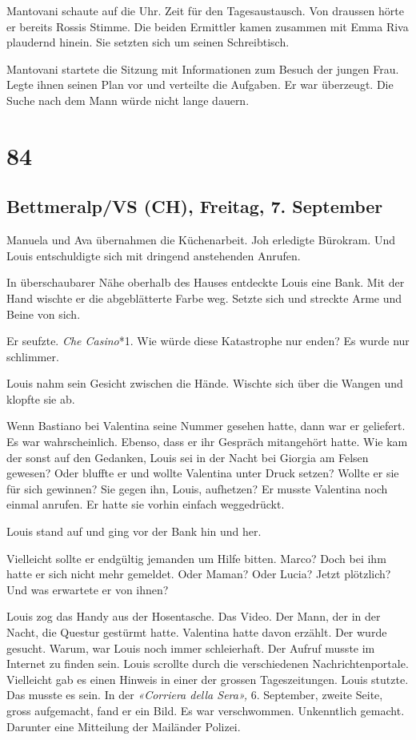 Mantovani schaute auf die Uhr. Zeit für den Tagesaustausch. Von draussen
hörte er bereits Rossis Stimme. Die beiden Ermittler kamen zusammen mit
Emma Riva plaudernd hinein. Sie setzten sich um seinen Schreibtisch.

Mantovani startete die Sitzung mit Informationen zum Besuch der jungen
Frau. Legte ihnen seinen Plan vor und verteilte die Aufgaben. Er war
überzeugt. Die Suche nach dem Mann würde nicht lange dauern.

\chapter{84}\label{section-84}

\section{Bettmeralp/VS (CH), Freitag, 7.
September}\label{bettmeralpvs-ch-freitag-7.-september}

Manuela und Ava übernahmen die Küchenarbeit. Joh erledigte Bürokram. Und
Louis entschuldigte sich mit dringend anstehenden Anrufen.

In überschaubarer Nähe oberhalb des Hauses entdeckte Louis eine Bank.
Mit der Hand wischte er die abgeblätterte Farbe weg. Setzte sich und
streckte Arme und Beine von sich.

Er seufzte. \emph{Che Casino}*1. Wie würde diese Katastrophe nur enden?
Es wurde nur schlimmer.

Louis nahm sein Gesicht zwischen die Hände. Wischte sich über die Wangen
und klopfte sie ab.

Wenn Bastiano bei Valentina seine Nummer gesehen hatte, dann war er
geliefert. Es war wahrscheinlich. Ebenso, dass er ihr Gespräch
mitangehört hatte. Wie kam der sonst auf den Gedanken, Louis sei in der
Nacht bei Giorgia am Felsen gewesen? Oder bluffte er und wollte
Valentina unter Druck setzen? Wollte er sie für sich gewinnen? Sie gegen
ihn, Louis, aufhetzen? Er musste Valentina noch einmal anrufen. Er hatte
sie vorhin einfach weggedrückt.

Louis stand auf und ging vor der Bank hin und her.

Vielleicht sollte er endgültig jemanden um Hilfe bitten. Marco? Doch bei
ihm hatte er sich nicht mehr gemeldet. Oder Maman? Oder Lucia? Jetzt
plötzlich? Und was erwartete er von ihnen?

Louis zog das Handy aus der Hosentasche. Das Video. Der Mann, der in der
Nacht, die Questur gestürmt hatte. Valentina hatte davon erzählt. Der
wurde gesucht. Warum, war Louis noch immer schleierhaft. Der Aufruf
musste im Internet zu finden sein. Louis scrollte durch die
verschiedenen Nachrichtenportale. Vielleicht gab es einen Hinweis in
einer der grossen Tageszeitungen. Louis stutzte. Das musste es sein. In
der \emph{«Corriera della Sera»,} 6. September, zweite Seite, gross
aufgemacht, fand er ein Bild. Es war verschwommen. Unkenntlich gemacht.
Darunter eine Mitteilung der Mailänder Polizei.

